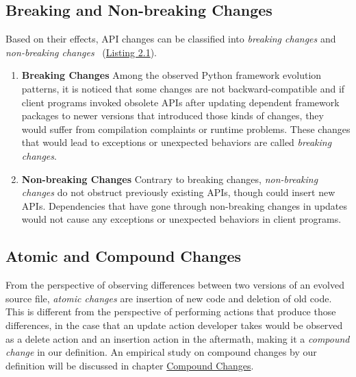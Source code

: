 \subsection{Breaking and Non-breaking Changes}

Based on their effects, API changes can be classified into \textit{breaking changes} and \textit{non-breaking changes}~\cite{api-evo-refactoring} (\hyperref[lst:break-nonbreak-change]{Listing 2.1}).

\begin{enumerate}
	\item \textbf{Breaking Changes} Among the observed Python framework evolution patterns, it is noticed that some changes are not backward-compatible and if client programs invoked obsolete APIs after updating dependent framework packages to newer versions that introduced those kinds of changes, they would suffer from compilation complaints or runtime problems. These changes that would lead to exceptions or unexpected behaviors are called \textit{breaking changes}.
	\item \textbf{Non-breaking Changes} Contrary to breaking changes, \textit{non-breaking changes} do not obstruct previously existing APIs, though could insert new APIs. Dependencies that have gone through non-breaking changes in updates would not cause any exceptions or unexpected behaviors in client programs.
\end{enumerate}

\begin{figure}[!t]
	
	\vspace{-5mm}
\end{figure}

\subsection{Atomic and Compound Changes}

From the perspective of observing differences between two versions of an evolved source file, \textit{atomic changes} are insertion of new code and deletion of old code. This is different from the perspective of performing actions that produce those differences, in the case that an update action developer takes would be observed as a delete action and an insertion action in the aftermath, making it a \textit{compound change} in our definition. An empirical study on compound changes by our definition will be discussed in chapter \hyperref[chap:compound-changes]{Compound Changes}.

